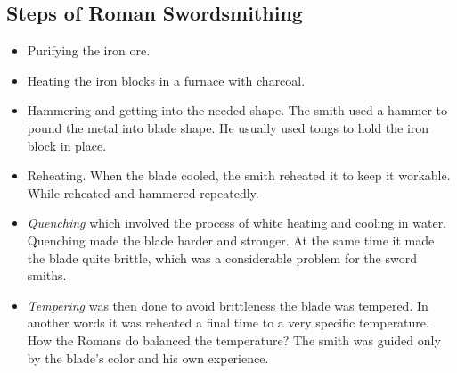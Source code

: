 \subsection{Steps of Roman Swordsmithing}
\begin{itemize}
\item Purifying the iron ore. 
\item Heating the iron blocks in a furnace with charcoal. 
\item Hammering and getting into the needed shape. The smith used a hammer to pound the metal into blade shape. He usually used tongs to hold the iron block in place. 
\item Reheating. When the blade cooled, the smith reheated it to keep it workable. While reheated and hammered repeatedly.
\item \emph{Quenching} which involved the process of white heating and cooling in water. Quenching made the blade harder and stronger. At the same time it made the blade quite brittle, which was a considerable problem for the sword smiths.
\item \emph{Tempering} was then done to avoid brittleness the blade was tempered. In another words it was reheated a final time to a very specific temperature. How the Romans do balanced the temperature? The smith was guided only by the blade's color and his own experience. 
\end{itemize}

